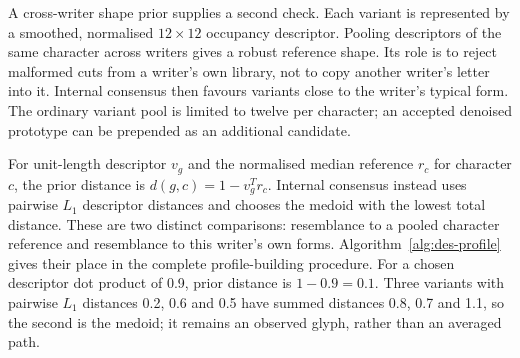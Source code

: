A cross-writer shape prior supplies a second check. Each variant is represented by a smoothed, normalised $12\times12$ occupancy descriptor. Pooling descriptors of the same character across writers gives a robust reference shape. Its role is to reject malformed cuts from a writer's own library, not to copy another writer's letter into it. Internal consensus then favours variants close to the writer's typical form. The ordinary variant pool is limited to twelve per character; an accepted denoised prototype can be prepended as an additional candidate.~\cite[style.py; synthesise.py; reproduce.py]{braunepipeline2026}

For unit-length descriptor $v_g$ and the normalised median reference $r_c$ for character $c$, the prior distance is $d(g,c)=1-v_g^Tr_c$. Internal consensus instead uses pairwise $L_1$ descriptor distances and chooses the medoid with the lowest total distance. These are two distinct comparisons: resemblance to a pooled character reference and resemblance to this writer's own forms. Algorithm~\ref{alg:des-profile} gives their place in the complete profile-building procedure. For a chosen descriptor dot product of 0.9, prior distance is $1-0.9=0.1$. Three variants with pairwise $L_1$ distances 0.2, 0.6 and 0.5 have summed distances 0.8, 0.7 and 1.1, so the second is the medoid; it remains an observed glyph, rather than an averaged path.~\cite[style.py; synthesise.py]{braunepipeline2026}


\begin{designalgorithm}
\caption{Labelled handwriting to a persistent writer profile~\cite{brauneevidence2026,braunepipeline2026}}
\label{alg:des-profile}
\begin{designpseudo}
\end{designpseudo}
\end{designalgorithm}

